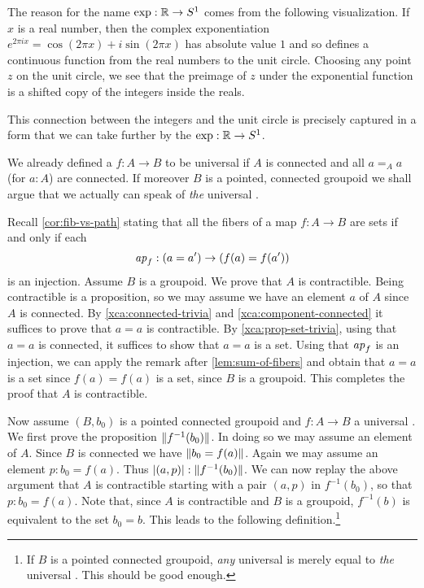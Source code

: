 \begin{remark}
  \label{rem:expforreal}
  The reason for the name $\exp:\mathbb{R}\to {S^1}$ comes from the following visualization.  
If $x$ is a real number, then the complex exponentiation 
$e^{2\pi i x}=\cos(2\pi x)+i\sin(2\pi x)$ has absolute value $1$ and 
so defines a continuous function from the real numbers to the unit circle.  
Choosing any point $z$ on the unit circle, we see that the preimage of $z$ under the exponential function is a shifted copy of the integers inside the reals. 
 
This connection between the integers and the unit circle is precisely captured in a form that we can take further by the \covering $\exp:\mathbb{R}\to {S^1}$.
\end{remark}

We already defined a \covering $f:A\to B$ to be universal if $A$ is connected
and all $a=_A a$ (for $a:A$) are connected. 
If moreover $B$ is a pointed, connected groupoid we shall argue that
we actually can speak of \emph{the} universal \covering.

Recall \cref{cor:fib-vs-path} stating that all the fibers of a map $f:A\to B$ 
are sets if and only if each 
\[
\mathop{{\it ap}_{f}}: (a=a')\to (f(a)=f(a'))
\]
is an injection. Assume $B$ is a groupoid.
We prove that $A$ is contractible. 
Being contractible is a proposition, so we may assume 
we have an element $a$ of $A$ since $A$ is connected. 
By \cref{xca:connected-trivia} and \ref{xca:component-connected} 
it suffices to prove that $a=a$ is contractible.
By \cref{xca:prop-set-trivia}, using that $a=a$ is connected,
it suffices to show that $a=a$ is a set.
Using that $\mathop{{\it ap}_{f}}$ is an injection, we can apply the remark after
\cref{lem:sum-of-fibers} and obtain that $a=a$ is a set since
$f(a)=f(a)$ is a set, since $B$ is a groupoid.
This completes the proof that $A$ is contractible.

Now assume $(B,b_0)$ is a pointed connected groupoid and $f:A\to B$
a universal \covering. We first prove the proposition $\lVert f^{-1}(b_0)\rVert$.
In doing so we may assume an element of $A$. Since $B$ is connected
we have $\lVert b_0 = f(a)\rVert$. Again we may assume an element $p: b_0=f(a)$.
Thus $\lvert(a,p)\rvert:\lVert f^{-1}(b_0)\rVert$. 
We can now replay the above argument that $A$ is contractible starting
with a pair $(a,p)$ in $f^{-1}(b_0)$, so that $p: b_0 = f(a)$.
Note that, since $A$ is contractible and $B$ is a groupoid,
$f^{-1}(b)$ is equivalent to the set $b_0 = b$.
This leads to the following definition.\footnote{%
If $B$ is a pointed connected groupoid,
\emph{any} universal \covering is merely equal to \emph{the} universal \covering.
This should be good enough.}

